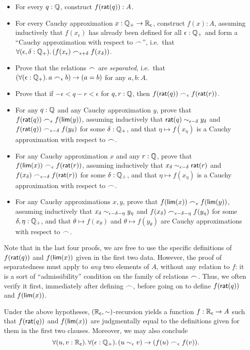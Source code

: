 \begin{itemize}
\item For every $q : \mathbb{Q}$, construct $f(\mathsf{rat}(q)) : A$.
\item For every Cauchy approximation $x : \mathbb{Q}_{+} \to \mathbb{R}_\mathsf{c}$, construct $f(x) : A$, assuming inductively that $f(x_\epsilon)$ has already been defined for all $\epsilon : \mathbb{Q}_{+}$ and form a ``Cauchy approximation with respect to $\frown$'', i.e.\ that $\fall{\epsilon,\delta:\Qp} (f(x_\epsilon) \bsim_{\epsilon+\delta} f(x_\delta))$.
\item Prove that the relations $\frown$ are \emph{separated}, i.e.\ that $(\fall{\epsilon:\Qp} a\bsim_\epsilon b) \to (a=b)$ for any $a,b:A$.
\item Prove that if $-\epsilon< q-r <\epsilon$ for $q,r:\mathbb{Q}$, then $f(\mathsf{rat}(q))\frown_\epsilon f(\mathsf{rat}(r))$.
\item For any $q:\mathbb{Q}$ and any Cauchy approximation $y$, prove that $f(\mathsf{rat}(q)) \frown_\epsilon f(\mathsf{lim}(y))$, assuming inductively that $\mathsf{rat}(q)\sim_{\epsilon-\delta} y_\delta$ and $f(\mathsf{rat}(q)) \frown_{\epsilon-\delta} f(y_\delta)$ for some $\delta:\mathbb{Q}_{+}$, and that $\eta \mapsto f(x_\eta)$ is a Cauchy approximation with respect to $\frown$.
\item For any Cauchy approximation $x$ and any $r:\mathbb{Q}$, prove that $f(\mathsf{lim}(x)) \frown_\epsilon f(\mathsf{rat}(r))$, assuming inductively that $x_\delta \sim_{\epsilon-\delta} \mathsf{rat}(r)$ and $f(x_\delta) \frown_{\epsilon-\delta} f(\mathsf{rat}(r))$ for some $\delta:\mathbb{Q}_{+}$, and that $\eta\mapsto f(x_\eta)$ is a Cauchy approximation with respect to $\frown$.
\item For any Cauchy approximations $x,y$, prove that $f(\mathsf{lim}(x)) \frown_\epsilon f(\mathsf{lim}(y))$, assuming inductively that $x_\delta \sim_{\epsilon-\delta-\eta} y_\eta$ and $f(x_\delta) \frown_{\epsilon-\delta-\eta} f(y_\eta)$ for some $\delta,\eta:\mathbb{Q}_{+}$, and that $\theta\mapsto f(x_\theta)$ and $\theta\mapsto f(y_\theta)$ are Cauchy approximations with respect to $\frown$.
\end{itemize}
Note that in the last four proofs, we are free to use the specific definitions of $f(\mathsf{rat}(q))$ and $f(\mathsf{lim}(x))$ given in the first two data.
However, the proof of separatedness must apply to \emph{any} two elements of $A$, without any relation to $f$: it is a sort of ``admissibility'' condition on the family of relations $\frown$.
Thus, we often verify it first, immediately after defining $\frown$, before going on to define $f(\mathsf{rat}(q))$ and $f(\mathsf{lim}(x))$.

Under the above hypotheses, $(\mathbb{R}_\mathsf{c},\mathord\sim)$-recursion yields a function $f:\mathbb{R}_\mathsf{c}\to A$ such that $f(\mathsf{rat}(q))$ and $f(\mathsf{lim}(x))$ are judgmentally equal to the definitions given for them in the first two clauses.
Moreover, we may also conclude
\begin{equation}
  \fall{u,v:\RC}{\epsilon:\Qp} (u\close\epsilon v) \to (f(u) \bsim_\epsilon f(v)).\label{eq:RC-sim-recursion-extra}
\end{equation}

